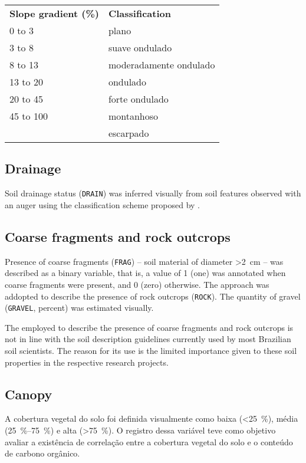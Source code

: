 \begin{tabular}{ll}
\textbf{Slope gradient (\%)} & \textbf{Classification} \\
0 to 3  & plano \\
3 to 8  & suave ondulado \\
8 to 13 & moderadamente ondulado \\
13 to 20 & ondulado \\
20 to 45 & forte ondulado \\
45 to 100 & montanhoso \\
\greater100 & escarpado \\
\end{tabular}

\tocless\subsection{Drainage}

Soil drainage status (\texttt{DRAIN}) was inferred visually from soil features observed with an auger using the 
classification scheme proposed by .

\tocless\subsection{Coarse fragments and rock outcrops}

Presence of coarse fragments (\texttt{FRAG}) -- soil material of diameter \SI{>2}{\centi\metre} -- was described 
as a binary variable, that is, a value of \num{1} (one) was annotated when coarse fragments were present, and 
\num{0} (zero) otherwise. The approach was addopted to describe the presence of rock outcrops (\texttt{ROCK}). The 
quantity of gravel (\texttt{GRAVEL}, \si{percent}) was estimated visually.

The employed to describe the presence of coarse fragments and rock outcrops is not in line with the soil 
description guidelines currently used by most Brazilian soil scientists. The reason for its use is the limited 
importance given to these soil properties in the respective research projects.

\tocless\subsection{Canopy}

A cobertura vegetal do solo foi definida visualmente como baixa (\SI{<25}{\percent}), média 
(\SIrange{25}{75}{\percent}) e alta (\SI{>75}{\percent}). O registro dessa variável teve como objetivo avaliar
a existência de correlação entre a cobertura vegetal do solo e o conteúdo de carbono orgânico.

